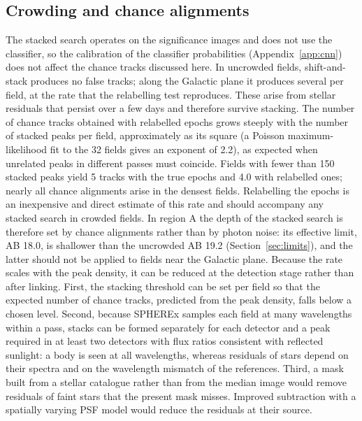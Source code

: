 \documentclass[twocolumn,linenumbers]{aastex702}
\begin{document}
\subsection{Crowding and chance alignments}
The stacked search operates on the significance images and does not use the classifier, so the calibration of the classifier probabilities (Appendix~\ref{app:cnn}) does not affect the chance tracks discussed here. In uncrowded fields, shift-and-stack produces no false tracks; along the Galactic plane it produces several per field, at the rate that the relabelling test reproduces. These arise from stellar residuals that persist over a few days and therefore survive stacking. The number of chance tracks obtained with relabelled epochs grows steeply with the number of stacked peaks per field, approximately as its square (a Poisson maximum-likelihood fit to the 32 fields gives an exponent of 2.2), as expected when unrelated peaks in different passes must coincide. Fields with fewer than 150 stacked peaks yield 5 tracks with the true epochs and 4.0 with relabelled ones; nearly all chance alignments arise in the densest fields. Relabelling the epochs is an inexpensive and direct estimate of this rate and should accompany any stacked search in crowded fields. In region A the depth of the stacked search is therefore set by chance alignments rather than by photon noise: its effective limit, AB 18.0, is shallower than the uncrowded AB 19.2 (Section~\ref{sec:limits}), and the latter should not be applied to fields near the Galactic plane. Because the rate scales with the peak density, it can be reduced at the detection stage rather than after linking. First, the stacking threshold can be set per field so that the expected number of chance tracks, predicted from the peak density, falls below a chosen level. Second, because SPHEREx samples each field at many wavelengths within a pass, stacks can be formed separately for each detector and a peak required in at least two detectors with flux ratios consistent with reflected sunlight: a body is seen at all wavelengths, whereas residuals of stars depend on their spectra and on the wavelength mismatch of the references. Third, a mask built from a stellar catalogue rather than from the median image would remove residuals of faint stars that the present mask misses. Improved subtraction with a spatially varying PSF model would reduce the residuals at their source.
\end{document}
